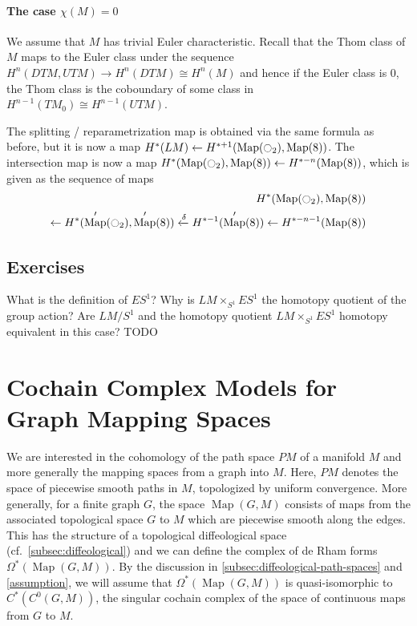 \documentclass{scrartcl}
\theoremstyle{plain}
\theoremstyle{definition}
\newcommand{\iso}{\cong}
\newcommand{\from}{\leftarrow}
\DeclareMathOperator{\Map}{Map}
\begin{document}
\paragraph{The case $\chi(M) = 0$} We assume that $M$ has trivial Euler characteristic. Recall that the Thom class of $M$ maps to the Euler class under the sequence $H^n(DTM, UTM)\to H^n(DTM)\iso H^n(M)$ and hence if the Euler class is $0$, the Thom class is the coboundary of some class in $H^{n-1}(TM_0)\iso H^{n-1}(UTM)$.

The splitting / reparametrization map is obtained via the same formula as before, but it is now a map $H^*(LM) \from H^{*+1}(\Map(\ocircle_2), \Map(8))$. The intersection map is now a map $H^*(\Map(\ocircle_2), \Map(8)) \from H^{*-n}(\Map(8))$, which is given as the sequence of maps
\begin{align*}
    H^*(\Map(\ocircle_2), \Map(8)) \\ \from H^*(\Map'(\ocircle_2), \Map'(8)) \xleftarrow{\delta} H^{*-1}(\Map'(8)) \from H^{*-n-1}(\Map(8))
\end{align*}


\subsection{Exercises}


What is the definition of $ES^1$? Why is $LM\times_{S^1} ES^1$ the homotopy quotient of the group action? Are $LM/S^1$ and the homotopy quotient $LM\times_{S^1} ES^1$ homotopy equivalent in this case? TODO




\section{Cochain Complex Models for Graph Mapping Spaces}\label{sec:cochain-models}

We are interested in the cohomology of the path space $PM$ of a manifold $M$ and more generally the mapping spaces from a graph into $M$. Here, $PM$ denotes the space of piecewise smooth paths in $M$, topologized by uniform convergence. More generally, for a finite graph $G$, the space $\Map(G, M)$ consists of maps from the associated topological space $G$ to $M$ which are piecewise smooth along the edges. This has the structure of a topological diffeological space (cf.\ \cref{subsec:diffeological}) and we can define the complex of de Rham forms $\Omega^*(\Map(G, M))$. By the discussion in \cref{subsec:diffeological-path-spaces} and \cref{assumption}, we will assume that $\Omega^*(\Map(G, M))$ is quasi-isomorphic to $C^*(C^0(G, M))$, the singular cochain complex of the space of continuous maps from $G$ to $M$. 
\end{document}
